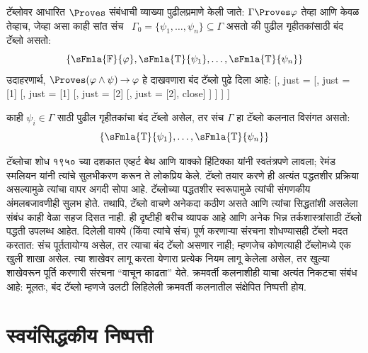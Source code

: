 \documentclass[11pt,a4paper,openany]{book}
\theoremstyle{definition}
\newcommand{\lif}{\mathbin{\to}}
\newcommand{\True}{\ensuremath{\mathbb{T}}}
\newcommand{\False}{\ensuremath{\mathbb{F}}}
\newcommand{\TAss}{\text{गृहीतक}}
\newenvironment{oltableau}{\center\tableau{}}{\endtableau\endcenter}
\begin{document}
टॅब्लोवर आधारित $\Proves$ संबंधाची व्याख्या पुढीलप्रमाणे केली जाते:
$\Gamma \Proves \varphi$ तेव्हा आणि केवळ तेव्हाच, जेव्हा असा काही सांत संच
~$\Gamma_0 = \{\psi_1, \dots, \psi_n\} \subseteq \Gamma$ असतो की पुढील
गृहीतकांसाठी बंद टॅब्लो असतो:
\[
\{\sFmla{\False}{\varphi}, \sFmla{\True}{\psi_1}, \dots, \sFmla{\True}{\psi_n}\}
\]
उदाहरणार्थ, $\Proves (\varphi \land \psi) \lif \varphi$ हे दाखवणारा बंद टॅब्लो
पुढे दिला आहे:
\begin{oltableau}
  [\sFmla{\False}{(\varphi \land \psi) \lif \varphi}, just = \TAss
    [\sFmla{\True}{\varphi \land \psi}, just = {\TRule{\False}{\lif}[1]}
      [\sFmla{\False}{\varphi}, just = {\TRule{\False}{\lif}[1]}
        [\sFmla{\True}{\varphi}, just = {\TRule{\True}{\land}[2]}
          [\sFmla{\True}{\psi}, just = {\TRule{\True}{\land}[2]}, close]
        ]
      ]
    ]
  ]
\end{oltableau}

काही $\psi_i \in \Gamma$ साठी पुढील गृहीतकांचा बंद टॅब्लो असेल, तर
संच $\Gamma$ हा टॅब्लो कलनात विसंगत असतो:
\[
\{\sFmla{\True}{\psi_1}, \dots, \sFmla{\True}{\psi_n}\}
\]

टॅब्लोचा शोध १९५० च्या दशकात एव्हर्ट बेथ आणि याक्को हिंटिक्का यांनी
स्वतंत्रपणे लावला; रेमंड स्मलियन यांनी त्यांचे सुलभीकरण करून ते लोकप्रिय
केले. टॅब्लो तयार करणे ही अत्यंत पद्धतशीर प्रक्रिया असल्यामुळे त्यांचा
वापर अगदी सोपा आहे. टॅब्लोच्या पद्धतशीर स्वरूपामुळे त्यांची
संगणकीय अंमलबजावणीही सुलभ होते. तथापि, टॅब्लो वाचणे अनेकदा कठीण
असते आणि त्यांचा सिद्धतांशी असलेला संबंध काही वेळा सहज दिसत नाही. ही
दृष्टीही बरीच व्यापक आहे आणि अनेक भिन्न तर्कशास्त्रांसाठी टॅब्लो
पद्धती उपलब्ध आहेत. दिलेली वाक्ये (किंवा त्यांचे संच) पूर्ण करणाऱ्या
संरचना शोधण्यासही टॅब्लो मदत करतात: संच पूर्ततायोग्य असेल,
तर त्याचा बंद टॅब्लो असणार नाही; म्हणजेच कोणत्याही टॅब्लोमध्ये
एक खुली शाखा असेल. त्या शाखेवर लागू करता येणारा प्रत्येक नियम लागू केलेला
असेल, तर खुल्या शाखेवरून पूर्ति करणारी संरचना ``वाचून काढता'' येते.
क्रमवर्ती कलनाशीही याचा अत्यंत निकटचा संबंध आहे: मूलतः, बंद टॅब्लो
म्हणजे उलटी लिहिलेली क्रमवर्ती कलनातील संक्षेपित निष्पत्ती होय.









\section{स्वयंसिद्धकीय निष्पत्ती}\label{fol:prf:axd:sec}
\end{document}
